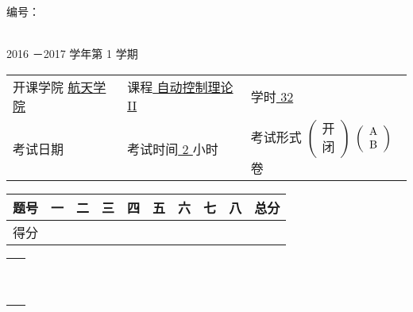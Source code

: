 \documentclass[12pt,oneside]{article}
\begin{document}
\noindent 编号：\underline {\hspace{4eM}}



\begin{center}
\textbf{ \fontsize{18pt}{\baselineskip}\selectfont{西北工业大学考试试题（卷）}}\\
2016 －2017    学年第 1 学期
\end{center}

{
\flushleft

\begin{tabular}{lll}
开课学院 \underline {\hspace{1em} 航天学院\hspace{1em} }& 课程\underline {\hspace{1em} 自动控制理论II\hspace{1em} }& 学时\underline {\hspace{1em} 32\hspace{1em} }\\
考试日期\underline {\hspace{6eM} }& 考试时间\underline {\hspace{1em} 2\hspace{1em} }小时 & 考试形式
$\left(\begin{array}{c}
\mbox{开}\\
\mbox{闭}
\end{array} \right)$
$\left(\begin{array}{*{10}c}
 \mbox{A} \\
 \mbox{B} 
\end{array} \right)$卷 
\end{tabular}
}

{
\center
\renewcommand{\tabcolsep}{1.2em}
\begin{tabular}{|c|c|c|c|c|c|c|c|c|c|} 
\hline
题号 & 一 & 二 & 三 & 四 & 五 & 六 & 七 & 八 & 总分 \\
\hline
得分 &    &    &    &    &    &    &    &    & \\
\hline 
\end{tabular}
}
\begin{tabular}{c}
\ \\
\ 
\end{tabular}
\newcommand{\onlytest}[1]{#1}
\newcommand{\onlyanswer}[1]{}

\clearpage
\end{document}
